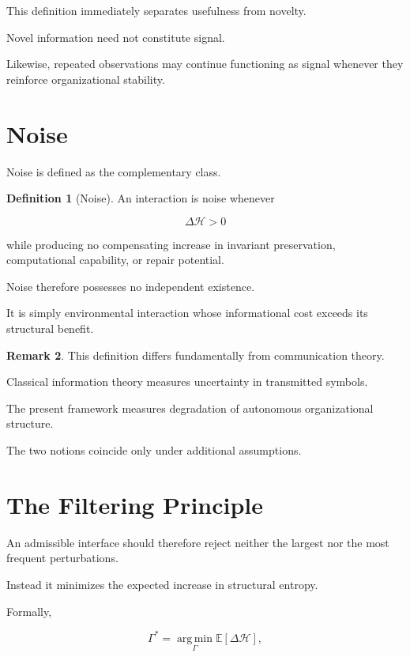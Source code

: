 \documentclass[11pt,oneside]{book}
\numberwithin{equation}{chapter}
\theoremstyle{definition}
\newtheorem{definition}{Definition}[chapter]
\newtheorem{remark}[definition]{Remark}
\theoremstyle{plain}
\begin{document}
This definition immediately separates usefulness from novelty.

Novel information need not constitute signal.

Likewise, repeated observations may continue functioning as signal whenever
they reinforce organizational stability.

\section{Noise}

Noise is defined as the complementary class.

\begin{definition}[Noise]

An interaction is noise whenever

\[
\Delta\mathcal{H}>0
\]

while producing no compensating increase in invariant preservation,
computational capability, or repair potential.

\end{definition}

Noise therefore possesses no independent existence.

It is simply environmental interaction whose informational cost exceeds its
structural benefit.

\begin{remark}

This definition differs fundamentally from communication theory.

Classical information theory measures uncertainty in transmitted symbols.

The present framework measures degradation of autonomous organizational
structure.

The two notions coincide only under additional assumptions.

\end{remark}

\section{The Filtering Principle}

An admissible interface should therefore reject neither the largest nor the
most frequent perturbations.

Instead it minimizes the expected increase in structural entropy.

Formally,

\[
\Gamma^{*}
=
\operatorname*{arg\,min}_{\Gamma}
\mathbb{E}
\left[
\Delta\mathcal{H}
\right],
\]
\end{document}
